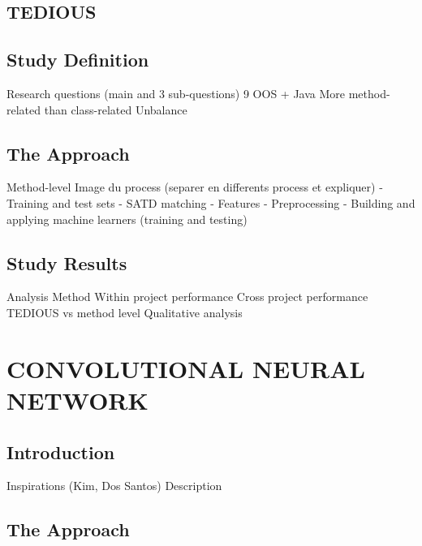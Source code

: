 \documentclass{beamer}
\begin{document}
\begin{darkframes}

	    \section{TEDIOUS}
	    
	    	\subsection{Study Definition}	
	    	
	    	Research questions (main and 3 sub-questions)
	    	9 OOS + Java
	    	More method-related than class-related
		    Unbalance
		    
		    \subsection{The Approach}
		    
		    Method-level
		    Image du process (separer en differents process et expliquer)
		    	- Training and test sets
		    	- SATD matching
		    	- Features
		    	- Preprocessing
		    	- Building and applying machine learners (training and testing)
		    
		    \subsection{Study Results}
		    
		    Analysis Method
		    Within project performance
		    Cross project performance
		    TEDIOUS vs method level
		    Qualitative analysis
		    
	\end{darkframes}

	\section{CONVOLUTIONAL NEURAL NETWORK}
	
		\subsection{Introduction}
		
		Inspirations (Kim, Dos Santos)
		Description

		\subsection{The Approach}
		
\end{document}
